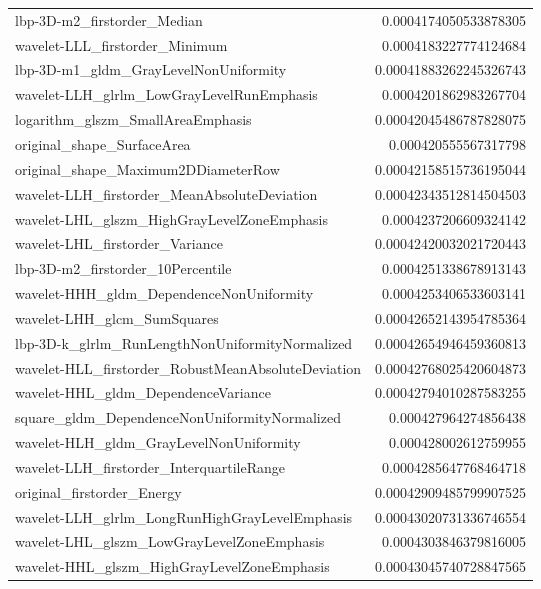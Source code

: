 {\begin{xltabular}[H]{\textwidth}{X r}
        lbp-3D-m2\_firstorder\_Median & 0.0004174050533878305 \\
        wavelet-LLL\_firstorder\_Minimum & 0.0004183227774124684 \\
        lbp-3D-m1\_gldm\_GrayLevelNonUniformity & 0.00041883262245326743 \\
        wavelet-LLH\_glrlm\_LowGrayLevelRunEmphasis & 0.0004201862983267704 \\
        logarithm\_glszm\_SmallAreaEmphasis & 0.00042045486787828075 \\
        original\_shape\_SurfaceArea & 0.000420555567317798 \\
        original\_shape\_Maximum2DDiameterRow & 0.00042158515736195044 \\
        wavelet-LLH\_firstorder\_MeanAbsoluteDeviation & 0.00042343512814504503 \\
        wavelet-LHL\_glszm\_HighGrayLevelZoneEmphasis & 0.0004237206609324142 \\
        wavelet-LHL\_firstorder\_Variance & 0.00042420032021720443 \\
        lbp-3D-m2\_firstorder\_10Percentile & 0.0004251338678913143 \\
        wavelet-HHH\_gldm\_DependenceNonUniformity & 0.0004253406533603141 \\
        wavelet-LHH\_glcm\_SumSquares & 0.00042652143954785364 \\
        lbp-3D-k\_glrlm\_RunLengthNonUniformityNormalized & 0.00042654946459360813 \\
        wavelet-HLL\_firstorder\_RobustMeanAbsoluteDeviation & 0.00042768025420604873 \\
        wavelet-HHL\_gldm\_DependenceVariance & 0.00042794010287583255 \\
        square\_gldm\_DependenceNonUniformityNormalized & 0.000427964274856438 \\
        wavelet-HLH\_gldm\_GrayLevelNonUniformity & 0.000428002612759955 \\
        wavelet-LLH\_firstorder\_InterquartileRange & 0.0004285647768464718 \\
        original\_firstorder\_Energy & 0.00042909485799907525 \\
        wavelet-LLH\_glrlm\_LongRunHighGrayLevelEmphasis & 0.00043020731336746554 \\
        wavelet-LHL\_glszm\_LowGrayLevelZoneEmphasis & 0.0004303846379816005 \\
        wavelet-HHL\_glszm\_HighGrayLevelZoneEmphasis & 0.00043045740728847565 \\

\end{xltabular}}
